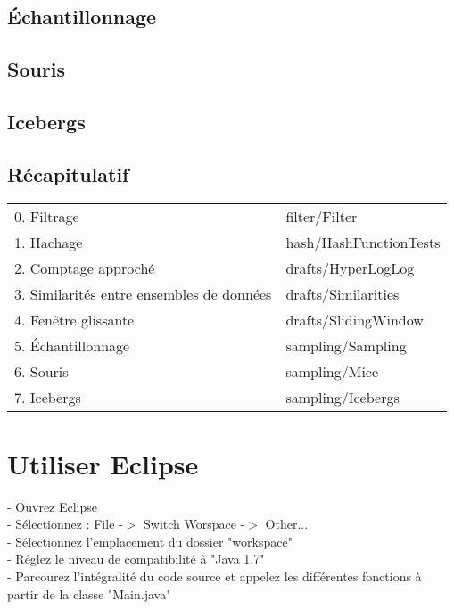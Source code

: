 \documentclass[12pt,a4paper,titlepage]{article}
\begin{document}
\subsection{Échantillonnage}

\subsection{Souris}

\subsection{Icebergs}

\subsection{Récapitulatif}
\begin{center} \begin{tabular}{ll}
0. Filtrage 		 & filter/Filter \\
1. Hachage 			 & hash/HashFunctionTests \\
2. Comptage approché & drafts/HyperLogLog \\
3. Similarités entre ensembles de données & drafts/Similarities \\
4. Fenêtre glissante & drafts/SlidingWindow \\
5. Échantillonnage 	 & sampling/Sampling \\
6. Souris 			 & sampling/Mice \\
7. Icebergs 		 & sampling/Icebergs
\end{tabular} \end{center}





\section{Utiliser Eclipse}
- Ouvrez Eclipse\\
- Sélectionnez : File -$>$ Switch Worspace -$>$ Other...\\
- Sélectionnez l'emplacement du dossier "workspace"\\
- Réglez le niveau de compatibilité à "Java 1.7"\\
- Parcourez l'intégralité du code source et appelez les différentes fonctions à partir de la classe "Main.java"
\end{document}
